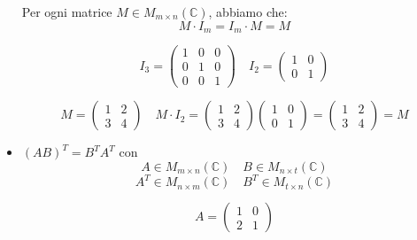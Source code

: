 \documentclass[a4paper]{article}
\theoremstyle{break}
\theoremstyle{break}
\theoremstyle{break}
\theoremstyle{break}
\begin{document}
\begin{itemize}
    Per ogni matrice \( M \in M_{m \times n}(\mathbb{C}) \), abbiamo che:
    \[ M \cdot I_m = I_m \cdot M =  M \]
    \begin{figure}[H]
      \begin{example}
        \[
          I_3 = \begin{pmatrix} 
            1 & 0 & 0\\
            0 & 1 & 0\\
            0 & 0 & 1
          \end{pmatrix}
          \quad
          I_2 = \begin{pmatrix} 
            1 & 0\\
            0 & 1
          \end{pmatrix}
        \] 
      \end{example}
    \end{figure}
    \begin{figure}[H]
      \begin{example}
        \[
          M = \begin{pmatrix} 
            1 & 2\\
            3 & 4
          \end{pmatrix}
          \quad
          M \cdot I_2 = \begin{pmatrix} 
            1 & 2\\
            3 & 4
          \end{pmatrix}
          \begin{pmatrix} 
            1 & 0 \\
            0 & 1
          \end{pmatrix} 
          =
          \begin{pmatrix} 
            1 & 2\\
            3 & 4
          \end{pmatrix}
          = M
        \] 
      \end{example}
    \end{figure}
  \item \( (AB)^T = B^T A^T \) con \[ A \in M_{m \times n}(\mathbb{C}) \quad
    B \in M_{n \times t}(\mathbb{C}) \]
    \[
      A^T \in M_{n \times m}(\mathbb{C}) \quad
      B^T \in M_{t \times n}(\mathbb{C})
    \] 
    \begin{figure}[H]
      \begin{example}
        \[
          A = \begin{pmatrix}
            1 & 0\\
            2 & 1

\end{pmatrix}\]
\end{example}
\end{figure}
\end{itemize}
\end{document}
